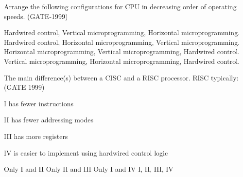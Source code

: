 \begin{questyle}
  \question  Arrange the following configurations for CPU in decreasing order of operating speeds.  (GATE-1999)

  \begin{choices}
    \choice         Hardwired control, Vertical microprogramming, Horizontal microprogramming.
    \CorrectChoice  Hardwired control, Horizontal microprogramming, Vertical microprogramming.
    \choice         Horizontal microprogramming, Vertical microprogramming, Hardwired control.
    \choice         Vertical microprogramming, Horizontal microprogramming, Hardwired control.
  \end{choices}
\end{questyle}


\begin{questyle}
  \question  The main difference(s) between a CISC and a RISC processor. RISC typically:  (GATE-1999)

    \begin{multicols}{2}
        \item[I] has fewer instructions
        \item[II] has fewer addressing modes
        \item[III] has more registers
        \item[IV] is easier to implement using hardwired control logic
    \end{multicols}

  \begin{oneparchoices}
    \choice         Only I and II
    \choice         Only II and III
    \choice         Only I and IV
    \CorrectChoice  I, II, III, IV
  \end{oneparchoices}
\end{questyle}

\begin{comment}

\begin{questyle}
  \question  zzz  (GATE-zzz)

  \begin{choices}
    \choice         zzz
    \choice         zzz
    \choice         zzz
    \choice         zzz
\CorrectChoice
  \end{choices}
\end{questyle}

\begin{questyle}
  \question  zzz  (GATE-zzz)

  \begin{choices}
    \choice         zzz
    \choice         zzz
    \choice         zzz
    \choice         zzz
\CorrectChoice
  \end{choices}
\end{questyle}

\end{comment}




